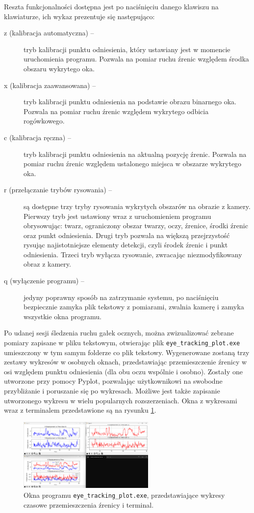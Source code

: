 \documentclass[a4paper,twoside,12pt]{book}
\begin{document}
Reszta funkcjonalności dostępna jest po naciśnięciu danego klawiszu na klawiaturze, ich wykaz prezentuje się następująco:

\begin{description}
	\item[z (kalibracja automatyczna) --] tryb kalibracji punktu odniesienia, który ustawiany jest w momencie uruchomienia programu. Pozwala na pomiar ruchu źrenic względem środka obszaru wykrytego oka.
	\item[x (kalibracja zaawansowana) --] tryb kalibracji punktu odniesienia na podstawie obrazu binarnego oka. Pozwala na pomiar ruchu źrenic względem wykrytego odbicia rogówkowego.
	\item[c (kalibracja ręczna) --]  tryb kalibracji punktu odniesienia na aktualną pozycję źrenic. Pozwala na pomiar ruchu źrenic względem ustalonego miejsca w obszarze wykrytego oka.
	\item[r (przełączanie trybów rysowania) --] są dostępne trzy tryby rysowania wykrytych obszarów na obrazie z kamery. Pierwszy tryb jest ustawiony wraz z uruchomieniem programu obrysowując: twarz, ograniczony obszar twarzy, oczy, źrenice, środki źrenic oraz punkt odniesienia. Drugi tryb pozwala na większą przejrzystość rysując najistotniejsze elementy detekcji, czyli środek źrenic i punkt odniesienia. Trzeci tryb wyłącza rysowanie, zwracając niezmodyfikowany obraz z kamery.
	\item[q (wyłączenie programu) --] jedyny poprawny sposób na zatrzymanie systemu, po naciśnięciu bezpiecznie zamyka plik tekstowy z pomiarami, zwalnia kamerę i zamyka wszystkie okna programu.
\end{description}

Po udanej sesji śledzenia ruchu gałek ocznych, można zwizualizować zebrane pomiary zapisane w pliku tekstowym, otwierając plik \texttt{eye\_\-tracking\_\-plot.exe} umieszczony w tym samym folderze co plik tekstowy. Wygenerowane zostaną trzy zestawy wykresów w osobnych oknach, przedstawiając przemieszczenie źrenicy w osi względem punktu odniesienia (dla obu oczu wspólnie i osobno). Zostały one utworzone przy pomocy Pyplot, pozwalając użytkownikowi na swobodne przybliżanie i poruszanie się po wykresach. Możliwe jest także zapisanie utworzonego wykresu w wielu popularnych rozszerzeniach. Okna z wykresami wraz z terminalem przedstawione są na rysunku \ref{fig:eye_tracking_plot-wykresy-i-terminal}.

\begin{figure}[htbp]
	\centering
	\includegraphics[width=0.6\textwidth]{pic/obsługa/wykresy.png}
	\caption{Okna programu \texttt{eye\_\-tracking\_\-plot.exe}, przedstawiające wykresy czasowe przemieszczenia źrenicy i terminal.}
	\label{fig:eye_tracking_plot-wykresy-i-terminal}
\end{figure}
\end{document}
